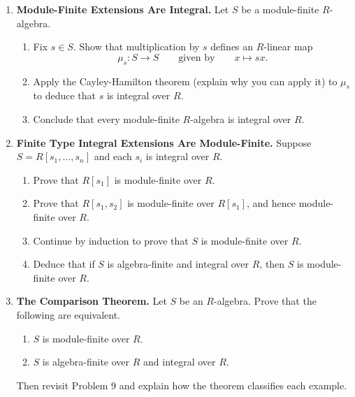 \documentclass[12pt,reqno]{amsart}
\begin{document}
\begin{enumerate}[leftmargin=*, resume=problems]

\item \textbf{Module-Finite Extensions Are Integral.} Let $S$ be a module-finite $R$-algebra.
\begin{enumerate}
    \item Fix $s\in S$. Show that multiplication by $s$ defines an $R$-linear map
    \[
    \mu_s:S\longrightarrow S
    \qquad \text{given by} \qquad
    x\longmapsto sx.
    \]
    \item Apply the Cayley-Hamilton theorem (explain why you can apply it) to $\mu_{s}$ to deduce that $s$ is integral over $R$.
    \item Conclude that every module-finite $R$-algebra is integral over $R$.
\end{enumerate}

\item \textbf{Finite Type Integral Extensions Are Module-Finite.} Suppose $S=R[s_1,\ldots,s_n]$ and each $s_i$ is integral over $R$.
\begin{enumerate}
    \item Prove that $R[s_1]$ is module-finite over $R$.
    \item Prove that $R[s_1,s_2]$ is module-finite over $R[s_1]$, and hence module-finite over $R$.
    \item Continue by induction to prove that $S$ is module-finite over $R$.
    \item Deduce that if $S$ is algebra-finite and integral over $R$, then $S$ is module-finite over $R$.
\end{enumerate}

\item \textbf{The Comparison Theorem.} Let $S$ be an $R$-algebra. Prove that the following are equivalent.
\begin{enumerate}
    \item $S$ is module-finite over $R$.
    \item $S$ is algebra-finite over $R$ and integral over $R$.
\end{enumerate}
Then revisit Problem 9 and explain how the theorem classifies each example.


\end{enumerate}
\end{document}
